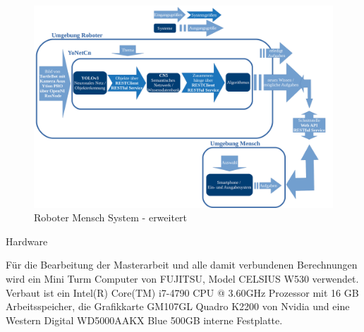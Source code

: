 \begin{figure}[h]
	
	\begin{center}
		
		\includegraphics[width=16cm]{images/Masteridee_4.png}
		
		\caption{Roboter Mensch System - erweitert}
		
		\label{Roboter_Mensch_System2}
		
	\end{center}
	
	
\end{figure}




Hardware 


Für die Bearbeitung der Masterarbeit und alle damit verbundenen Berechnungen wird ein Mini Turm Computer von FUJITSU, Model CELSIUS W530 verwendet. Verbaut ist ein Intel(R) Core(TM) i7-4790 CPU @ 3.60GHz Prozessor mit 16 GB Arbeitsspeicher, die Grafikkarte GM107GL Quadro K2200 von Nvidia und eine Western Digital WD5000AAKX Blue 500GB interne Festplatte. 

